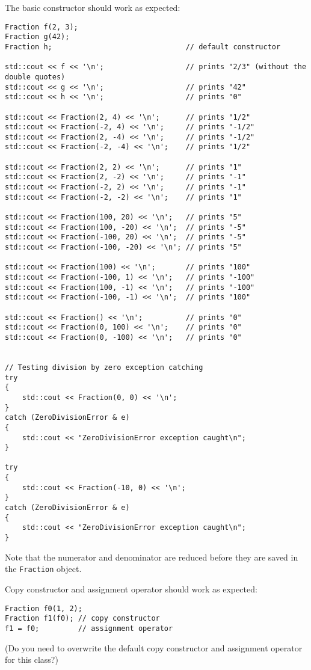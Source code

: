 The basic constructor should work as expected:
\begin{Verbatim}[frame=single,fontsize=\footnotesize, commandchars=\~\!\@]
Fraction f(2, 3);
Fraction g(42);                           
Fraction h;                               // default constructor

std::cout << f << '\n';                   // prints "2/3" (without the double quotes)
std::cout << g << '\n';                   // prints "42"
std::cout << h << '\n';                   // prints "0" 

std::cout << Fraction(2, 4) << '\n';      // prints "1/2"
std::cout << Fraction(-2, 4) << '\n';     // prints "-1/2"
std::cout << Fraction(2, -4) << '\n';     // prints "-1/2"
std::cout << Fraction(-2, -4) << '\n';    // prints "1/2"

std::cout << Fraction(2, 2) << '\n';      // prints "1"
std::cout << Fraction(2, -2) << '\n';     // prints "-1"
std::cout << Fraction(-2, 2) << '\n';     // prints "-1"
std::cout << Fraction(-2, -2) << '\n';    // prints "1"

std::cout << Fraction(100, 20) << '\n';   // prints "5"
std::cout << Fraction(100, -20) << '\n';  // prints "-5"
std::cout << Fraction(-100, 20) << '\n';  // prints "-5"
std::cout << Fraction(-100, -20) << '\n'; // prints "5"

std::cout << Fraction(100) << '\n';       // prints "100"
std::cout << Fraction(-100, 1) << '\n';   // prints "-100"
std::cout << Fraction(100, -1) << '\n';   // prints "-100"
std::cout << Fraction(-100, -1) << '\n';  // prints "100"

std::cout << Fraction() << '\n';          // prints "0"
std::cout << Fraction(0, 100) << '\n';    // prints "0"
std::cout << Fraction(0, -100) << '\n';   // prints "0"


// Testing division by zero exception catching
try
{
    std::cout << Fraction(0, 0) << '\n';
}
catch (ZeroDivisionError & e)
{
    std::cout << "ZeroDivisionError exception caught\n";
}

try
{
    std::cout << Fraction(-10, 0) << '\n';
}
catch (ZeroDivisionError & e)
{
    std::cout << "ZeroDivisionError exception caught\n";
}
\end{Verbatim}
Note that the numerator and denominator are reduced before they are
saved in the \texttt{Fraction} object.

Copy constructor and assignment operator should work as expected:
\begin{Verbatim}[frame=single,fontsize=\footnotesize]
Fraction f0(1, 2);
Fraction f1(f0); // copy constructor
f1 = f0;         // assignment operator
\end{Verbatim}
(Do you need to overwrite the default copy constructor
and assignment operator for this class?)

